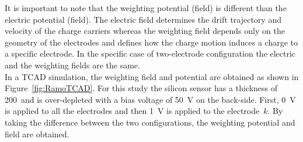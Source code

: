  It is important to note that the weighting potential (field) is
 different than the electric potential (field). The electric field
 determines the drift trajectory and velocity of the charge carriers
 whereas the weighting field depends only on the geometry of the
 electrodes and defines how the charge motion induces a charge to a
 specific electrode. In the specific case of two-electrode configuration the
 electric and the weighting fields are the same. \\
In a TCAD simulation, the weighting field and potential are obtained
as shown in Figure~\ref{fig:RamoTCAD}. For this study the silicon
sensor has a thickness of 200~\micron and is over-depleted with a bias
voltage of \SI{50}{\volt} on the back-side. First, \SI{0}{\volt} is
applied to all the electrodes and then \SI{1}{\volt} is applied to the
electrode~$k$. By taking the difference between the two
configurations, the weighting potential and field are obtained.



